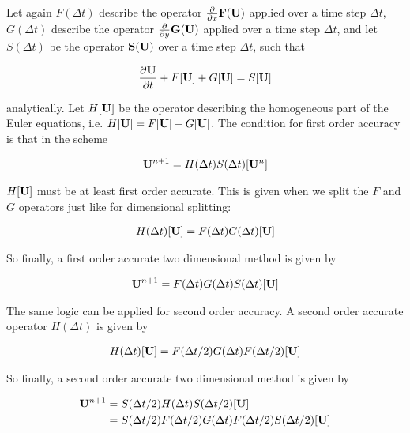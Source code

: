 Let again $F(\Delta t)$ describe the operator $\frac{\partial}{\partial x} \mathbf{F}(\mathbf{U})$ applied over a time step $\Delta t$, $G(\Delta t)$ describe the operator $\frac{\partial}{\partial y} \mathbf{G}(\mathbf{U})$ applied over a time step $\Delta t$, and let $S(\Delta t)$ be the operator $\mathbf{S}(\mathbf{U})$ over a time step $\Delta t$, such that

\begin{align}
	\frac{\partial \mathbf{U}}{\partial t} + F[\mathbf{U}] + G[\mathbf{U}] = S [\mathbf{U}]
\end{align}

analytically.
Let $H[\mathbf{U}]$ be the operator describing the homogeneous part of the Euler equations, i.e. $H[\mathbf{U}] = F[\mathbf{U}] + G[\mathbf{U}]$.
The condition for first order accuracy is that in the scheme

\begin{align}
	\mathbf{U}^{n+1} = H(\Delta t) S(\Delta t) [\mathbf{U}^n]
\end{align}

$H[\mathbf{U}]$ must be at least first order accurate.
This is given when we split the $F$ and $G$ operators just like for dimensional splitting:

\begin{align}
	H(\Delta t) [\mathbf{U}] = F(\Delta t) G(\Delta t) [\mathbf{U}]
\end{align}


So finally, a first order accurate two dimensional method is given by

\begin{align}
	\mathbf{U}^{n+1} = F(\Delta t) G(\Delta t) S(\Delta t) [\mathbf{U}]
\end{align}


The same logic can be applied for second order accuracy.
A second order accurate operator $H(\Delta t)$ is given by

\begin{align}
	H(\Delta t) [\mathbf{U}] = F(\Delta t / 2) G(\Delta t) F(\Delta t / 2)[\mathbf{U}]
\end{align}


So finally, a second order accurate two dimensional method is given by

\begin{align}
	\mathbf{U}^{n+1} &= S(\Delta t / 2) H(\Delta t) S(\Delta t / 2)[\mathbf{U}]\\
			 &= S(\Delta t / 2) F(\Delta t / 2) G(\Delta t) F(\Delta t / 2) S(\Delta t / 2)[\mathbf{U}]
\end{align}











